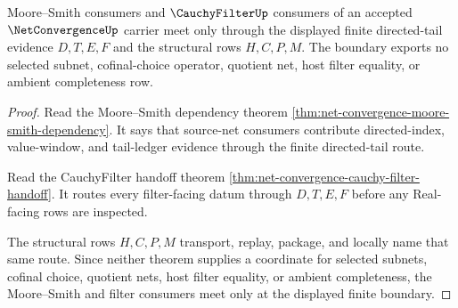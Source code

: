 \begin{theorem}
\label{thm:net-convergence-moore-smith-filter-boundary}
Moore--Smith consumers and $\CauchyFilterUp$ consumers of an accepted $\NetConvergenceUp$ carrier meet only through the displayed finite directed-tail evidence $D,T,E,F$ and the structural rows $H,C,P,M$. The boundary exports no selected subnet, cofinal-choice operator, quotient net, host filter equality, or ambient completeness row.
\end{theorem}
\begin{proof}
Read the Moore--Smith dependency theorem \autoref{thm:net-convergence-moore-smith-dependency}. It says that source-net consumers contribute directed-index, value-window, and tail-ledger evidence through the finite directed-tail route.

Read the CauchyFilter handoff theorem \autoref{thm:net-convergence-cauchy-filter-handoff}. It routes every filter-facing datum through $D,T,E,F$ before any Real-facing rows are inspected.

The structural rows $H,C,P,M$ transport, replay, package, and locally name that same route. Since neither theorem supplies a coordinate for selected subnets, cofinal choice, quotient nets, host filter equality, or ambient completeness, the Moore--Smith and filter consumers meet only at the displayed finite boundary.
\end{proof}

